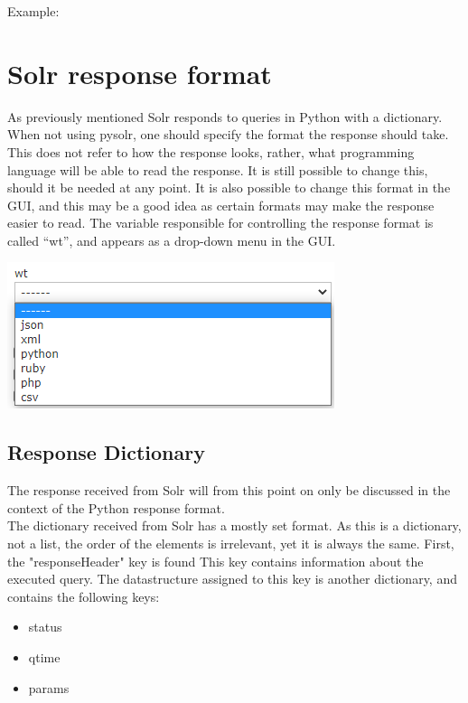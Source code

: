 \documentclass[a4paper,english]{report}
\begin{document}
Example: 




\section{Solr response format}

As previously mentioned Solr responds to queries in Python with a dictionary. When not using pysolr, one should specify the format the response should take. This does not refer to how the response looks, rather, what programming language will be able to read the response. It is still possible to change this, should it be needed at any point. It is also possible to change this format in the GUI, and this may be a good idea as certain formats may make the response easier to read.
The variable responsible for controlling the response format is called “wt”, and appears as a drop-down menu in the GUI. 

\includegraphics{gui2}

\subsection{Response Dictionary}

The response received from Solr will from this point on only be discussed in the context of the Python response format.\\

The dictionary received from Solr has a mostly set format. As this is a dictionary, not a list, the order of the elements is irrelevant, yet it is always the same. First, the "responseHeader" key is found This key contains information about the executed query. The datastructure assigned to this key is another dictionary, and contains the following keys:\\

\begin{itemize}

\item status
\item qtime
\item params 


\end{itemize}
\end{document}
